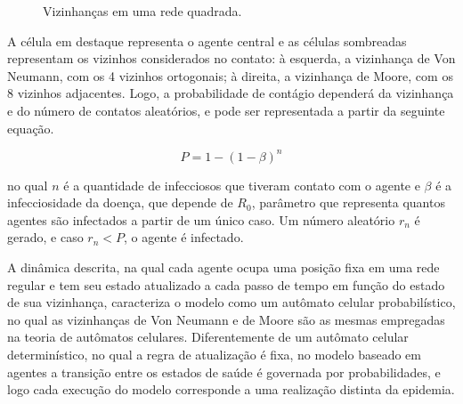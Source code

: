 \begin{figure}[H]
\centering
\caption{Vizinhanças em uma rede quadrada.}
\label{fig:vizinhancas}
\end{figure}

A célula em destaque representa o agente central e as células sombreadas representam os vizinhos considerados no contato: à esquerda, a vizinhança de Von Neumann, com os 4 vizinhos ortogonais; à direita, a vizinhança de Moore, com os 8 vizinhos adjacentes. Logo, a probabilidade de contágio dependerá da vizinhança e do número de contatos aleatórios, e pode ser representada a partir da seguinte equação.

\begin{equation}\label{eqn:prob}
    P = 1 - ( 1 - \beta)^n
\end{equation}

no qual $n$ é a quantidade de infecciosos que tiveram contato com o agente e $\beta$ é a infecciosidade da doença, que depende de $R_0$, parâmetro que representa quantos agentes são infectados a partir de um único caso. Um número aleatório $r_n$ é gerado, e caso $r_n < P$, o agente é infectado.

A dinâmica descrita, na qual cada agente ocupa uma posição fixa em uma rede regular e tem seu estado atualizado a cada passo de tempo em função do estado de sua vizinhança, caracteriza o modelo como um autômato celular probabilístico, no qual as vizinhanças de Von Neumann e de Moore são as mesmas empregadas na teoria de autômatos celulares. Diferentemente de um autômato celular determinístico, no qual a regra de atualização é fixa, no modelo baseado em agentes a transição entre os estados de saúde é governada por probabilidades, e logo cada execução do modelo corresponde a uma realização distinta da epidemia.

